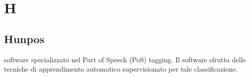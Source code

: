 \section*{H}
\subsection*{Hunpos}
software specializzato nel Part of Speech (PoS) tagging. Il software sfrutta delle tecniche di apprendimento automatico supervisionato per tale classificazione.  

